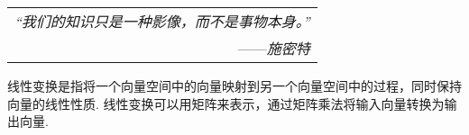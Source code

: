 \begin{flushright}
    \begin{tabular}{r||}
        \textit{“我们的知识只是一种影像，而不是事物本身。”}\\
        ——\textit{施密特}
    \end{tabular}
\end{flushright}

线性变换是指将一个向量空间中的向量映射到另一个向量空间中的过程，同时保持向量的线性性质. 线性变换可以用矩阵来表示，通过矩阵乘法将输入向量转换为输出向量. 